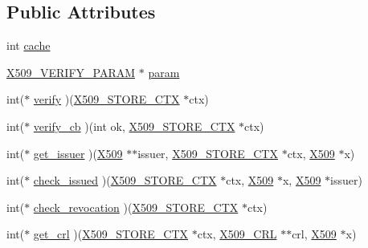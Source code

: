 \subsection*{Public Attributes}
\begin{DoxyCompactItemize}
\item 
int \hyperlink{structx509__store__st_a39100a4cc433d10485ffe0c30c5b88f8}{cache}
\item 
\hyperlink{x509__vfy_8h_a9b8209a7a29bafa279e1b5bc5f81cb23}{X509\+\_\+\+V\+E\+R\+I\+F\+Y\+\_\+\+P\+A\+R\+AM} $\ast$ \hyperlink{structx509__store__st_a988c764019923790356d956bc071c50b}{param}
\item 
int($\ast$ \hyperlink{structx509__store__st_a942efe26133aadd04d45f30a824644a7}{verify} )(\hyperlink{ossl__typ_8h_ae681945a2cf88d6337137dc0260a1545}{X509\+\_\+\+S\+T\+O\+R\+E\+\_\+\+C\+TX} $\ast$ctx)
\item 
int($\ast$ \hyperlink{structx509__store__st_a2babc2b1c606dc4a45bee39bcb2dddad}{verify\+\_\+cb} )(int ok, \hyperlink{ossl__typ_8h_ae681945a2cf88d6337137dc0260a1545}{X509\+\_\+\+S\+T\+O\+R\+E\+\_\+\+C\+TX} $\ast$ctx)
\item 
int($\ast$ \hyperlink{structx509__store__st_a1201b752d9780b08579097b6f53f05b6}{get\+\_\+issuer} )(\hyperlink{ossl__typ_8h_a4f666bde6518f95deb3050c54b408416}{X509} $\ast$$\ast$issuer, \hyperlink{ossl__typ_8h_ae681945a2cf88d6337137dc0260a1545}{X509\+\_\+\+S\+T\+O\+R\+E\+\_\+\+C\+TX} $\ast$ctx, \hyperlink{ossl__typ_8h_a4f666bde6518f95deb3050c54b408416}{X509} $\ast$x)
\item 
int($\ast$ \hyperlink{structx509__store__st_a28e3031f30d155bfcee3077781875dd5}{check\+\_\+issued} )(\hyperlink{ossl__typ_8h_ae681945a2cf88d6337137dc0260a1545}{X509\+\_\+\+S\+T\+O\+R\+E\+\_\+\+C\+TX} $\ast$ctx, \hyperlink{ossl__typ_8h_a4f666bde6518f95deb3050c54b408416}{X509} $\ast$x, \hyperlink{ossl__typ_8h_a4f666bde6518f95deb3050c54b408416}{X509} $\ast$issuer)
\item 
int($\ast$ \hyperlink{structx509__store__st_af48617053d5abd22e6f0bb877a3801d9}{check\+\_\+revocation} )(\hyperlink{ossl__typ_8h_ae681945a2cf88d6337137dc0260a1545}{X509\+\_\+\+S\+T\+O\+R\+E\+\_\+\+C\+TX} $\ast$ctx)
\item 
int($\ast$ \hyperlink{structx509__store__st_a805b166e3886e35dac65014a43752c17}{get\+\_\+crl} )(\hyperlink{ossl__typ_8h_ae681945a2cf88d6337137dc0260a1545}{X509\+\_\+\+S\+T\+O\+R\+E\+\_\+\+C\+TX} $\ast$ctx, \hyperlink{ossl__typ_8h_ac8661d2485c2c8da5fd7dd26b846f4bf}{X509\+\_\+\+C\+RL} $\ast$$\ast$crl, \hyperlink{ossl__typ_8h_a4f666bde6518f95deb3050c54b408416}{X509} $\ast$x)

\end{DoxyCompactItemize}
